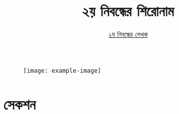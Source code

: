 \documentclass[12pt]{article}
\begin{document}
\begin{figure}[t]
        \centering 
        \texttt{[image: example-image]}
\end{figure}

\title{২য় নিবন্ধের শিরোনাম}
\author{\href{https://github.com/rafisics/ebook-template}{২য় নিবন্ধের লেখক}}
\date{}


\section{সেকশন}

\lipsum



\end{document}

